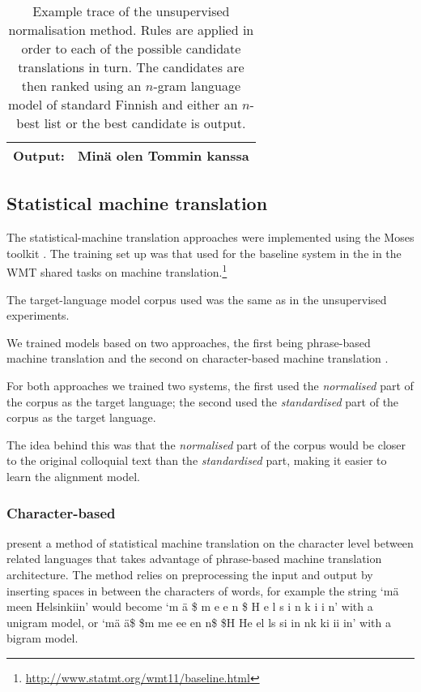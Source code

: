 \documentclass[11pt]{article}
\begin{document}
\begin{table*}
\begin{tabular}{|l|r|l|l|}
    \hline
    \textbf{Output:} & \multicolumn{3}{l|}{Min\"{a} olen Tommin kanssa} \\
    \hline
  \end{tabular}
  \caption{Example trace of the unsupervised normalisation method. Rules are applied in order to each of 
     the possible candidate translations in turn. The candidates are then ranked using an $n$-gram language model 
     of standard Finnish and either an $n$-best list
     or the best candidate is output.}
  \label{table:unsup-trace}
\end{table*}

\subsection{Statistical machine translation}


The statistical-machine translation approaches were implemented using the 
Moses toolkit \cite{koehn2007}. The training set up was that used for
the baseline system in the  in the WMT shared tasks
on machine translation.\footnote{\url{http://www.statmt.org/wmt11/baseline.html}}

The target-language model corpus used was the same as in the unsupervised experiments. 

We trained models based on two approaches, the first being phrase-based machine translation
\cite{zens2002} and the second on character-based machine translation \cite{nakov2012,TiedemannEAMT2009}.

For both approaches we trained two systems, the first used the \emph{normalised}
part of the corpus as the target language; the second used the \emph{standardised} 
part of the corpus as the target language.

The idea behind this was that the \emph{normalised} part of the corpus would be closer
to the original colloquial text than the \emph{standardised} part, making it easier
to learn the alignment model. 

\subsubsection{Character-based}

 present a method of statistical machine translation on the character level between related languages that takes advantage of phrase-based machine translation architecture. The method relies on preprocessing the input and output by inserting spaces in between the characters of words, for example the string `m\"{a} meen Helsinkiin' would become `m \"{a} \$ m e e n \$ H e l s i n k i i n' with a unigram model, or `m\"{a} \"{a}\$ \$m me ee en n\$ \$H He el ls si in nk ki ii in' with a bigram model.
\end{document}
